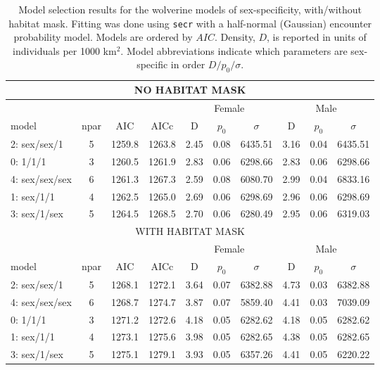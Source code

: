 {\begin{table}[ht]
\centering
\caption{
  Model selection results for the  wolverine models of sex-specificity,
  with/without habitat mask.  Fitting was done 
  using  \mbox{\tt secr} with a half-normal (Gaussian) encounter probability
  model. Models are ordered by
  $AIC$. Density, $D$, is
  reported in units of individuals per 1000 km$^2$. Model abbreviations
  indicate which parameters are sex-specific in order $D/p_{0}/\sigma$.
}
\begin{tabular}{lccccccccc}
\hline \hline
\multicolumn{10}{c}{NO HABITAT MASK} \\ \hline
        &      &     &      & \multicolumn{3}{c}{Female} & \multicolumn{3}{c}{Male} \\ 
  model & npar & AIC & AICc & D & $p_0$ & $\sigma$ & D & $p_0$ &  $\sigma$  \\ \hline
2: sex/sex/1    &  5&  1259.8& 1263.8 &2.45& 0.08& 6435.51& 3.16& 0.04& 6435.51\\
0: 1/1/1        &  3&  1260.5& 1261.9 &2.83& 0.06& 6298.66& 2.83& 0.06& 6298.66\\
4: sex/sex/sex  &  6&  1261.3& 1267.3 &2.59& 0.08& 6080.70& 2.99& 0.04& 6833.16\\
1: sex/1/1      &  4&  1262.5& 1265.0 &2.69& 0.06& 6298.69& 2.96& 0.06& 6298.69\\
3: sex/1/sex    &  5&  1264.5& 1268.5 &2.70& 0.06& 6280.49& 2.95& 0.06& 6319.03\\
\hline \hline
\multicolumn{10}{c}{WITH HABITAT MASK} \\ \hline
        &      &     &      & \multicolumn{3}{c}{Female} & \multicolumn{3}{c}{Male} \\ 
  model & npar & AIC & AICc & D & $p_0$ & $\sigma$ & D & $p_0$ &  $\sigma$ \\ \hline
2: sex/sex/1   &  5& 1268.1& 1272.1 &  3.64& 0.07& 6382.88& 4.73& 0.03& 6382.88 \\
4: sex/sex/sex &  6& 1268.7& 1274.7 &3.87& 0.07& 5859.40& 4.41& 0.03& 7039.09\\
0: 1/1/1       &  3& 1271.2& 1272.6 &4.18& 0.05& 6282.62& 4.18& 0.05& 6282.62\\
1: sex/1/1     &  4& 1273.1& 1275.6 &3.98& 0.05& 6282.65& 4.38& 0.05& 6282.65\\
3: sex/1/sex   &  5& 1275.1& 1279.1 &3.93& 0.05& 6357.26& 4.41& 0.05& 6220.22\\
\hline
\end{tabular}
\label{gof.tab.aic}
\end{table}


}
